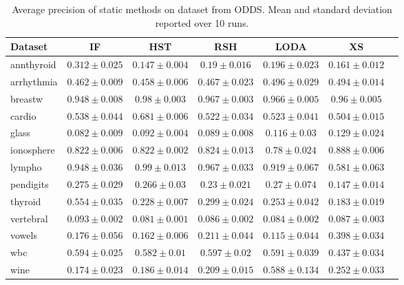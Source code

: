 \documentclass[11pt,onecolumn]{article}
\begin{document}
\begin{footnotesize}
\begin{table}[p!]
		\begin{tabular}{lcccccc}
				\toprule
				\textbf{Dataset} & \textbf{IF} &  \textbf{HST} & \textbf{RSH} &  \textbf{LODA}  & \textbf{XS}\\
\toprule
annthyroid& $0.312 \pm 0.025$ &  $0.147 \pm 0.004$ &  $0.19 \pm 0.016$ &  $0.196 \pm 0.023$ &  $0.161 \pm 0.012$    \\
arrhythmia& $0.462 \pm 0.009$ &  $0.458 \pm 0.006$ &  $0.467 \pm 0.023$ &  $0.496 \pm 0.029$ &  $0.494 \pm 0.014$    \\
breastw& $0.948 \pm 0.008$ &  $0.98 \pm 0.003$ &  $0.967 \pm 0.003$ &  $0.966 \pm 0.005$ &  $0.96 \pm 0.005$    \\
cardio& $0.538 \pm 0.044$ &  $0.681 \pm 0.006$ &  $0.522 \pm 0.034$ &  $0.523 \pm 0.041$ &  $0.504 \pm 0.015$    \\
glass& $0.082 \pm 0.009$ &  $0.092 \pm 0.004$ &  $0.089 \pm 0.008$ &  $0.116 \pm 0.03$ &  $0.129 \pm 0.024$    \\
ionosphere& $0.822 \pm 0.006$ &  $0.822 \pm 0.002$ &  $0.824 \pm 0.013$ &  $0.78 \pm 0.024$ &  $0.888 \pm 0.006$    \\
lympho& $0.948 \pm 0.036$ &  $0.99 \pm 0.013$ &  $0.967 \pm 0.033$ &  $0.919 \pm 0.067$ &  $0.581 \pm 0.063$    \\
pendigits& $0.275 \pm 0.029$ &  $0.266 \pm 0.03$ &  $0.23 \pm 0.021$ &  $0.27 \pm 0.074$ &  $0.147 \pm 0.014$    \\
thyroid& $0.554 \pm 0.035$ &  $0.228 \pm 0.007$ &  $0.299 \pm 0.024$ &  $0.253 \pm 0.042$ &  $0.183 \pm 0.019$    \\
vertebral& $0.093 \pm 0.002$ &  $0.081 \pm 0.001$ &  $0.086 \pm 0.002$ &  $0.084 \pm 0.002$ &  $0.087 \pm 0.003$    \\
vowels& $0.176 \pm 0.056$ &  $0.162 \pm 0.006$ &  $0.211 \pm 0.044$ &  $0.115 \pm 0.044$ &  $0.398 \pm 0.034$    \\
wbc& $0.594 \pm 0.025$ &  $0.582 \pm 0.01$ &  $0.597 \pm 0.02$ &  $0.591 \pm 0.039$ &  $0.437 \pm 0.034$    \\
wine& $0.174 \pm 0.023$ &  $0.186 \pm 0.014$ &  $0.209 \pm 0.015$ &  $0.588 \pm 0.134$ &  $0.252 \pm 0.033$    \\
\bottomrule
		\end{tabular}
		\caption{Average precision of static methods on dataset from ODDS. Mean and standard deviation reported over 10 runs.}
		\label{table:odds-static-results}
\end{table}
\end{footnotesize}
\end{document}
